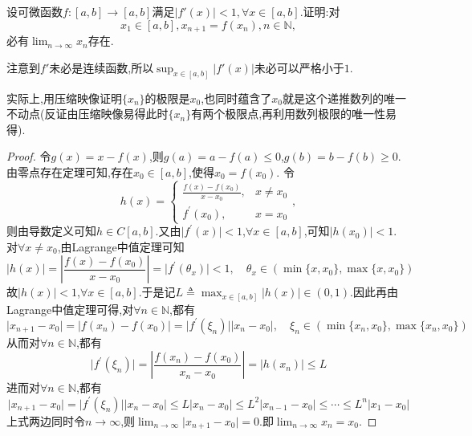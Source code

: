 \documentclass[../../main.tex]{subfiles}
\begin{document}
\begin{proposition}[加强的压缩映像]\label{proposition:加强的压缩映像}
设可微函数\(f:[a,b]\to[a,b]\)满足\(\vert f'(x)\vert<1,\forall x\in[a,b]\).证明:对
\[
x_1\in[a,b],x_{n + 1} = f(x_n),n\in\mathbb{N},
\]
必有\(\lim_{n \to \infty} x_n\)存在.  
\end{proposition}
\begin{remark}
注意到\(f'\)未必是连续函数,所以\(\sup_{x\in[a,b]}\vert f'(x)\vert\)未必可以严格小于\(1\).
\end{remark}
\begin{note}
实际上,用压缩映像证明$\{x_n\}$的极限是$x_0$,也同时蕴含了$x_0$就是这个递推数列的唯一不动点(反证由压缩映像易得此时$\{x_n\}$有两个极限点,再利用数列极限的唯一性易得).
\end{note}
\begin{proof}
令\(g(x)=x - f(x)\),则\(g(a)=a - f(a)\leqslant0\),\(g(b)=b - f(b)\geqslant0\).由零点存在定理可知,存在\(x_0\in[a,b]\),使得\(x_0 = f(x_0)\).
令\[h(x)=\begin{cases}
\frac{f(x) - f(x_0)}{x - x_0},&x\neq x_0\\
f^\prime(x_0),&x = x_0
\end{cases},\]则由导数定义可知\(h\in C[a,b]\).又由\(\vert f^\prime(x)\vert<1\),\(\forall x\in[a,b]\),可知\(\vert h(x_0)\vert<1\).
对\(\forall x\neq x_0\),由Lagrange中值定理可知
\[
\vert h(x)\vert=\left\vert\frac{f(x) - f(x_0)}{x - x_0}\right\vert=\vert f^\prime(\theta_x)\vert<1,\quad\theta_x\in(\min\{x,x_0\},\max\{x,x_0\})
\]
故\(\vert h(x)\vert<1\),\(\forall x\in[a,b]\).于是记\(L\triangleq\max_{x\in[a,b]}\vert h(x)\vert\in(0,1)\).因此再由Lagrange中值定理可得,对\(\forall n\in\mathbb{N}\),都有
\[
\vert x_{n + 1}-x_0\vert=\vert f(x_n) - f(x_0)\vert=\vert f^\prime(\xi_n)\vert\vert x_n - x_0\vert,\quad\xi_n\in(\min\{x_n,x_0\},\max\{x_n,x_0\})
\]
从而对\(\forall n\in\mathbb{N}\),都有
\[
\vert f^\prime(\xi_n)\vert=\left\vert\frac{f(x_n) - f(x_0)}{x_n - x_0}\right\vert=\vert h(x_n)\vert\leqslant L
\]
进而对\(\forall n\in\mathbb{N}\),都有
\[
\vert x_{n + 1}-x_0\vert=\vert f^\prime(\xi_n)\vert\vert x_n - x_0\vert\leqslant L\vert x_n - x_0\vert\leqslant L^2\vert x_{n - 1}-x_0\vert\leqslant\cdots\leqslant L^n\vert x_1 - x_0\vert
\]
上式两边同时令\(n\rightarrow\infty\),则\(\lim_{n\rightarrow\infty}\vert x_{n + 1}-x_0\vert = 0\).即\(\lim_{n\rightarrow\infty}x_n = x_0\).

\end{proof}
\end{document}
